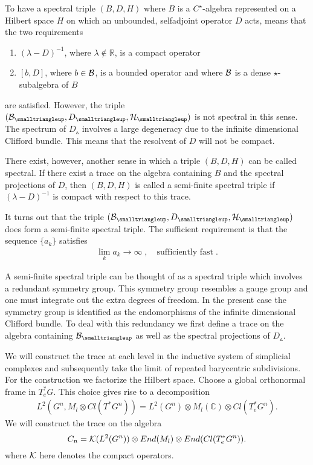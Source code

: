 \documentclass[12pt]{article}
\newcommand{\ba}{\begin{eqnarray}}
\newcommand{\ea}{\end{eqnarray}}
\def\l{\lambda}
\def\cb{{\cal B}}
\def\ch{{\cal H}}
\def\ck{{\cal K}}
\begin{document}
To have a spectral triple $(B,D,H)$ where $B$ is a $C^\star$-algebra represented on a Hilbert space $H$ on which an unbounded, selfadjoint operator $D$ acts, means that the two requirements
\begin{enumerate}
\item
$(\l - D)^{-1}$, where $\l\not\in\mathbb{R}$, is a compact operator
\item
$[b,D]$, where $b\in \cb$, is a bounded operator and where $\cb$ is a dense $\star$-subalgebra of $B$
\end{enumerate}
are satisfied. However, the triple $(\cb_{\smalltriangleup},D_{\smalltriangleup},\ch_\smalltriangleup)$ is not spectral in this sense. The spectrum of $D_{\smalltriangleup}$ involves a large degeneracy due to the infinite dimensional Clifford bundle. This means that the resolvent of $D$ will not be compact.

There exist, however, another sense in which a triple $(B,D,H)$ can be called spectral. If there exist a trace on the algebra containing $B$ and the spectral projections of $D$, then $(B,D,H)$ is called a semi-finite spectral triple if $(\l-D)^{-1}$ is compact with respect to this trace.



It turns out that the triple $(\cb_{\smalltriangleup},D_{\smalltriangleup},\ch_\smalltriangleup)$ does form a semi-finite spectral triple.  
The sufficient requirement is that the sequence $\{a_k\}$ satisfies
\ba
\lim_k a_k\rightarrow \infty\;,\quad \mbox{sufficiently fast}\;.
\label{suff}
\ea



A semi-finite spectral triple can be thought of as a spectral triple which involves a redundant symmetry group. This symmetry group resembles a gauge group and one must integrate out the extra degrees of freedom. In the present case the symmetry group is identified as the endomorphisms of the infinite dimensional Clifford bundle. To deal with this redundancy we first define a trace on the algebra containing $\cb_\smalltriangleup$ as well as the spectral projections of $D_{\smalltriangleup}$. 





We will construct the trace at each level in the inductive system of simplicial complexes and subsequently take the limit of repeated barycentric subdivisions. For the construction we factorize the Hilbert space. Choose a global orthonormal frame in $T^*_eG$. This choice gives rise to a decomposition 
\ba 
L^2(G^n, M_l\otimes Cl(T^* G^n ))=L^2(G^n )\otimes M_l(\mathbb{C}) \otimes Cl(T^*_e G^n).
\label{CliFF}
\ea
We will construct the trace on the algebra 
$$C_n=\ck (L^2(G^n ))\otimes End (M_l) \otimes End (Cl(T^*_e G^n)).$$
where $\ck$ here denotes the compact operators. 
\end{document}
